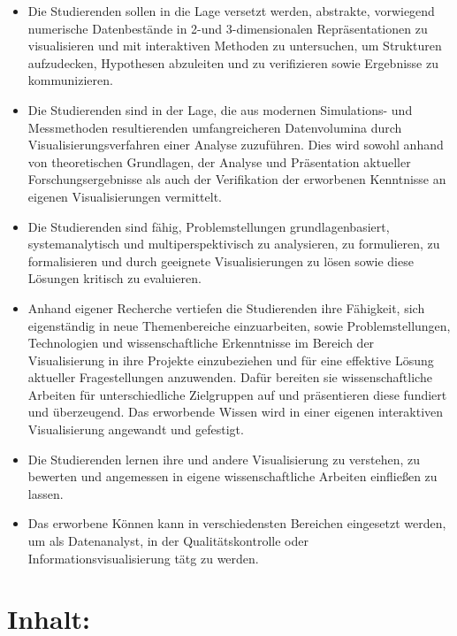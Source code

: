 \begin{itemize}
\tightlist
\item
  Die Studierenden sollen in die Lage versetzt werden, abstrakte,
  vorwiegend numerische Datenbestände in 2-und 3-dimensionalen
  Repräsentationen zu visualisieren und mit interaktiven Methoden zu
  untersuchen, um Strukturen aufzudecken, Hypothesen abzuleiten und zu
  verifizieren sowie Ergebnisse zu kommunizieren.
\item
  Die Studierenden sind in der Lage, die aus modernen Simulations- und
  Messmethoden resultierenden umfangreicheren Datenvolumina durch
  Visualisierungsverfahren einer Analyse zuzuführen. Dies wird sowohl
  anhand von theoretischen Grundlagen, der Analyse und Präsentation
  aktueller Forschungsergebnisse als auch der Verifikation der
  erworbenen Kenntnisse an eigenen Visualisierungen vermittelt.
\item
  Die Studierenden sind fähig, Problemstellungen grundlagenbasiert,
  systemanalytisch und multiperspektivisch zu analysieren, zu
  formulieren, zu formalisieren und durch geeignete Visualisierungen zu
  lösen sowie diese Lösungen kritisch zu evaluieren.
\item
  Anhand eigener Recherche vertiefen die Studierenden ihre Fähigkeit,
  sich eigenständig in neue Themenbereiche einzuarbeiten, sowie
  Problemstellungen, Technologien und wissenschaftliche Erkenntnisse im
  Bereich der Visualisierung in ihre Projekte einzubeziehen und für eine
  effektive Lösung aktueller Fragestellungen anzuwenden. Dafür bereiten
  sie wissenschaftliche Arbeiten für unterschiedliche Zielgruppen auf
  und präsentieren diese fundiert und überzeugend. Das erworbende Wissen
  wird in einer eigenen interaktiven Visualisierung angewandt und
  gefestigt.
\item
  Die Studierenden lernen ihre und andere Visualisierung zu verstehen,
  zu bewerten und angemessen in eigene wissenschaftliche Arbeiten
  einfließen zu lassen.
\item
  Das erworbene Können kann in verschiedensten Bereichen eingesetzt
  werden, um als Datenanalyst, in der Qualitätskontrolle oder
  Informationsvisualisierung tätg zu werden.
\end{itemize}

\section*{Inhalt:\label{/mi-2017/modulbeschreibungen-master/MA_VC_Modul_Visualisierung}}\label{inhaltpathlabelmi-2017modulbeschreibungen-mastermaux5fvcux5fmodulux5fvisualisierung}

